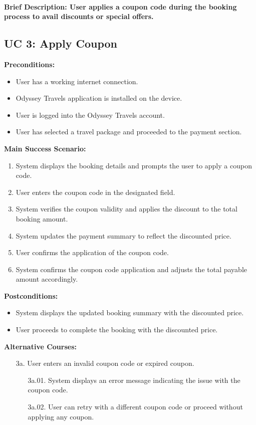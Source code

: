 \documentclass{scrreprt}
\begin{document}
\paragraph {\textnormal{Brief Description: 
User applies a coupon code during the booking process to avail discounts or special offers.}}

\subsection*{\textbf{UC 3: Apply Coupon}}

\textbf{Preconditions:}
\begin{itemize}
    \item User has a working internet connection.
    \item Odyssey Travels application is installed on the device.
    \item User is logged into the Odyssey Travels account.
    \item User has selected a travel package and proceeded to the payment section.
\end{itemize}

\textbf{Main Success Scenario:}
\begin{enumerate}
    \item System displays the booking details and prompts the user to apply a coupon code.
    \item User enters the coupon code in the designated field.
    \item System verifies the coupon validity and applies the discount to the total booking amount.
    \item System updates the payment summary to reflect the discounted price.
    \item User confirms the application of the coupon code.
    \item System confirms the coupon code application and adjusts the total payable amount accordingly.
\end{enumerate}

\textbf{Postconditions:}
\begin{itemize}
    \item System displays the updated booking summary with the discounted price.
    \item User proceeds to complete the booking with the discounted price.
\end{itemize}

\textbf{Alternative Courses:}
\begin{itemize}
    \item[3a.] User enters an invalid coupon code or expired coupon.
    \begin{itemize}
        \item[3a.01.] System displays an error message indicating the issue with the coupon code.
        \item[3a.02.] User can retry with a different coupon code or proceed without applying any coupon.
    \end{itemize}
\end{itemize}
\end{document}
